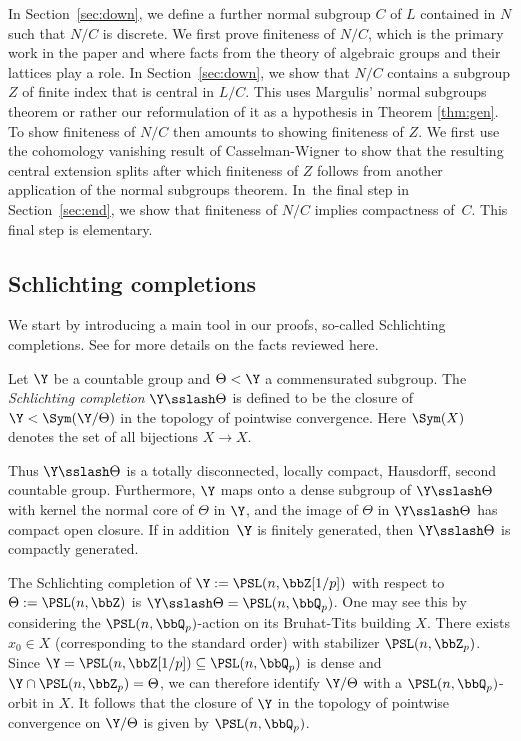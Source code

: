 In Section~\ref{sec:down}, we define a further normal subgroup $C$ of $L$ contained in $N$ such that $N/C$ is discrete. We first prove finiteness of $N/C$, which is the primary work in the paper
and where facts from the theory of algebraic groups and their lattices play a role. In Section~\ref{sec:down}, we show that $N/C$ contains a subgroup $Z$ of finite index that is central in $L/C$.
This uses Margulis' normal subgroups theorem or rather our reformulation of it as a hypothesis in Theorem \ref{thm:gen}. To show finiteness of $N/C$ then amounts to showing finiteness of $Z$. We first use the cohomology vanishing result of Casselman-Wigner to show that the resulting central extension splits after which finiteness of $Z$ follows from another application of the normal subgroups theorem.
In~the final step in Section~\ref{sec:end}, we show that finiteness of $N/C$ implies compactness of~$C$. This final step is elementary.

\subsection{Schlichting completions}\label{sec:schlichting-def}
We start by introducing a main tool in our proofs, so-called Schlichting completions. See \cite[\S 3]{shalom-willis} for more details on the facts reviewed here.

\begin{dfn} Let $\Y$ be a countable group and $\Theta<\Y$ a commensurated subgroup. The \emph{Schlichting completion} $\Y\sslash\Theta$ is defined to be the closure of $\Y<\Sym(\Y/\Theta)$ in the topology of pointwise convergence. Here $\Sym(X)$ denotes the set of all bijections $X\to X$.\end{dfn}

Thus $\Y\sslash\Theta$ is a totally disconnected, locally compact, Hausdorff, second countable group. Furthermore, $\Y$ maps onto a dense subgroup of $\Y\sslash\Theta$ with kernel the normal core of $\Theta$ in $\Y$, and the image of $\Theta$ in $\Y\sslash\Theta$ has compact open closure. If in addition~$\Y$ is finitely generated, then $\Y\sslash\Theta$ is compactly generated.

\begin{ex}\label{ex:schlichting-arithmetic}
The Schlichting completion of $\Y:=\PSL(n,\bbZ[1/p])$ with respect to $\Theta:=\PSL(n,\bbZ)$ is $\Y\sslash\Theta=\PSL(n,\bbQ_p)$. One may see this by considering the $\PSL(n,\bbQ_p)$-action on its Bruhat-Tits building $X$. There exists $x_0\in X$ (corresponding to the standard order) with stabilizer $\PSL(n,\bbZ_p)$. Since $\Y=\PSL(n,\bbZ[1/p])\subseteq\PSL(n,\bbQ_p)$ is dense and $\Y\cap \PSL(n,\bbZ_p)=\Theta$, we can therefore identify $\Y/\Theta$ with a $\PSL(n,\bbQ_p)$-orbit in $X$. It follows that the closure of $\Y$ in the topology of pointwise convergence on $\Y/\Theta$ is given by $\PSL(n,\bbQ_p)$.
\end{ex}

